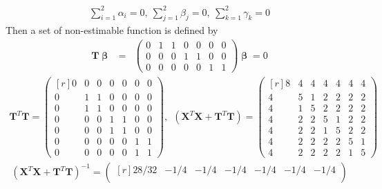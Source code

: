 \documentclass[12pt]{article} %
\begin{document}
\begin{enumerate}
\begin{itemize}
\begin{itemize}
		    \begin{eqnarray*}
		    \sum_{i=1}^{2}\alpha_{i}=0,~\sum_{j=1}^{2}\beta_{j}=0,~\sum_{k=1}^{2}\gamma_{k}=0
		    \end{eqnarray*}
		    Then a set of non-estimable function is defined by
		    \begin{eqnarray*}
		    \mathbf{T}\pmb{\upbeta}&=&
		    \begin{pmatrix}
		    0 & 1 & 1 & 0 & 0 & 0 & 0 \\
		    0 & 0 & 0 & 1 & 1 & 0 & 0 \\
		    0 & 0 & 0 & 0 & 0 & 1 & 1 
		    \end{pmatrix}\pmb{\upbeta}=0
		    \end{eqnarray*}
		    \begin{eqnarray*}
		     \mathbf{T}^{T}\mathbf{T}=
		      \begin{pmatrix}[r]
			    0 &   0 &   0 &   0 &   0 &   0 &   0 \\
			    0 &   1 &   1 &   0 &   0 &   0 &   0 \\
			    0 &   1 &   1 &   0 &   0 &   0 &   0 \\
			    0 &   0 &   0 &   1 &   1 &   0 &   0 \\
			    0 &   0 &   0 &   1 &   1 &   0 &   0 \\
			    0 &   0 &   0 &   0 &   0 &   1 &   1 \\
			    0 &   0 &   0 &   0 &   0 &   1 &   1		      
		      \end{pmatrix},~~
		      (\mathbf{X}^{T}\mathbf{X}+\mathbf{T}^{T}\mathbf{T})=
		      \begin{pmatrix}[r]
			    8 &   4 &   4 &   4 &   4 &   4 &   4 \\
			    4 &   5 &   1 &   2 &   2 &   2 &   2 \\
			    4 &   1 &   5 &   2 &   2 &   2 &   2 \\
			    4 &   2 &   2 &   5 &   1 &   2 &   2 \\
			    4 &   2 &   2 &   1 &   5 &   2 &   2 \\
			    4 &   2 &   2 &   2 &   2 &   5 &   1 \\
			    4 &   2 &   2 &   2 &   2 &   1 &   5		      
		      \end{pmatrix}
		    \end{eqnarray*}
		    \begin{eqnarray*}
		    (\mathbf{X}^{T}\mathbf{X}+\mathbf{T}^{T}\mathbf{T})^{-1}=
		    \begin{pmatrix}[r]
			  28/32 & -1/4 & -1/4 & -1/4 & -1/4 & -1/4 & -1/4 \\

\end{pmatrix}
\end{eqnarray*}
\end{itemize}
\end{itemize}
\end{enumerate}
\end{document}
